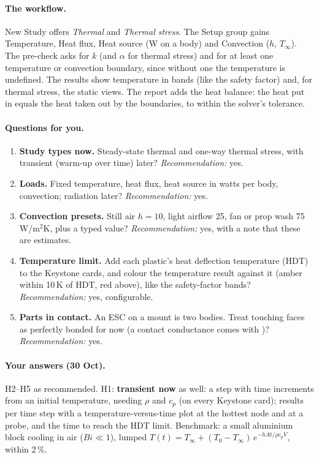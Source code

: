 \paragraph{The workflow.} New Study offers \emph{Thermal} and \emph{Thermal stress}. The Setup group gains
Temperature, Heat flux, Heat source (W on a body) and Convection ($h$, $T_\infty$). The pre-check asks for $k$
(and $\alpha$ for thermal stress) and for at least one temperature or convection boundary, since without one
the temperature is undefined. The results show temperature in bands (like the safety factor) and, for thermal
stress, the static views. The report adds the heat balance: the heat put in equals the heat taken out by the
boundaries, to within the solver's tolerance.

\paragraph{Questions for you.}
\begin{enumerate}[label=H\arabic*.]
  \item \textbf{Study types now.} Steady-state thermal and one-way thermal stress, with transient (warm-up over
        time) later? \emph{Recommendation:} yes.
  \item \textbf{Loads.} Fixed temperature, heat flux, heat source in watts per body, convection; radiation later?
        \emph{Recommendation:} yes.
  \item \textbf{Convection presets.} Still air $h=10$, light airflow 25, fan or prop wash 75\,W/m$^2$K, plus a typed
        value? \emph{Recommendation:} yes, with a note that these are estimates.
  \item \textbf{Temperature limit.} Add each plastic's heat deflection temperature (HDT) to the Keystone cards, and
        colour the temperature result against it (amber within 10\,K of HDT, red above), like the safety-factor
        bands? \emph{Recommendation:} yes, configurable.
  \item \textbf{Parts in contact.} An ESC on a mount is two bodies. Treat touching faces as perfectly bonded for
        now (a contact conductance comes with )? \emph{Recommendation:} yes.
\end{enumerate}

\paragraph{Your answers (30 Oct).} H2--H5 as recommended. H1: \textbf{transient now} as well: a
 step with time increments from an initial temperature, needing $\rho$ and $c_p$ (on every
Keystone card); results per time step with a temperature-versus-time plot at the hottest node and at a probe,
and the time to reach the HDT limit. Benchmark: a small aluminium block cooling in air ($Bi\ll1$), lumped
$T(t)=T_\infty+(T_0-T_\infty)\,e^{-hAt/\rho c_pV}$, within 2\,\%.
